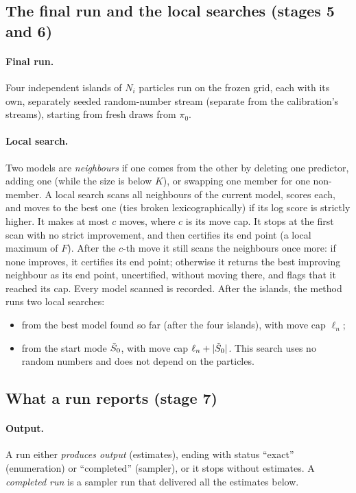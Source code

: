 \documentclass[11pt]{article}
\begin{document}
\subsection{The final run and the local searches (stages 5 and 6)}\label{sec:m-search}

\paragraph{Final run.} Four independent islands of $N_i$ particles run on the frozen grid, each with its own, separately
seeded random-number stream (separate from the calibration's streams), starting from fresh draws from $\pi_0$.

\paragraph{Local search.} Two models are \emph{neighbours} if one comes from the other by deleting one predictor, adding
one (while the size is below $K$), or swapping one member for one non-member. A local search scans all neighbours of the
current model, scores each, and moves to the best one (ties broken lexicographically) if its log score is strictly
higher. It makes at most $c$ moves, where $c$ is its move cap. It stops at the first scan with no strict improvement,
and then certifies its end point (a local maximum of $F$). After the $c$-th move it still scans the neighbours once more:
if none improves, it certifies its end point; otherwise it returns the best improving neighbour as its end point,
uncertified, without moving there, and flags that it reached its cap. Every model scanned is recorded. After the islands, the
method runs two local searches:
\begin{itemize}[leftmargin=1.5em,itemsep=1pt]
  \item from the best model found so far (after the four islands), with move cap $\ell_n$;
  \item from the start mode $\tilde S_0$, with move cap $\ell_n+\lvert \tilde S_0\rvert$. This search uses no random numbers and does not
    depend on the particles.
\end{itemize}

\subsection{What a run reports (stage 7)}\label{sec:m-outputs}

\paragraph{Output.} A run either \emph{produces output} (estimates), ending with status ``exact'' (enumeration) or
``completed'' (sampler), or it stops without estimates. A \emph{completed run} is a sampler run that delivered all the
estimates below.
\end{document}
